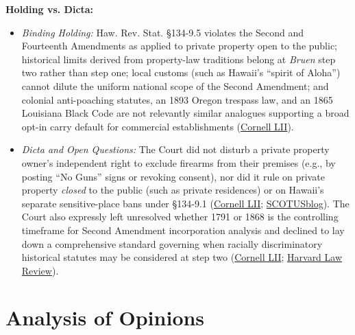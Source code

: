 \documentclass[12pt]{article}
\begin{document}
\textbf{Holding vs. Dicta:}
\begin{itemize}
\item \textit{Binding Holding:} Haw. Rev. Stat. \S{}134-9.5 violates the Second and Fourteenth Amendments as applied to private property open to the public; historical limits derived from property-law traditions belong at \textit{Bruen} step two rather than step one; local customs (such as Hawaii's ``spirit of Aloha'') cannot dilute the uniform national scope of the Second Amendment; and colonial anti-poaching statutes, an 1893 Oregon trespass law, and an 1865 Louisiana Black Code are not relevantly similar analogues supporting a broad opt-in carry default for commercial establishments (\href{https://www.law.cornell.edu/supremecourt/text/24-1046}{Cornell LII}).
\item \textit{Dicta and Open Questions:} The Court did not disturb a private property owner's independent right to exclude firearms from their premises (e.g., by posting ``No Guns'' signs or revoking consent), nor did it rule on private property \textit{closed} to the public (such as private residences) or on Hawaii's separate sensitive-place bans under \S{}134-9.1 (\href{https://www.law.cornell.edu/supremecourt/text/24-1046}{Cornell LII}; \href{https://www.scotusblog.com/2026/06/supreme-court-strikes-hawaii-gun-restriction/}{SCOTUSblog}). The Court also expressly left unresolved whether 1791 or 1868 is the controlling timeframe for Second Amendment incorporation analysis and declined to lay down a comprehensive standard governing when racially discriminatory historical statutes may be considered at step two (\href{https://www.law.cornell.edu/supremecourt/text/24-1046}{Cornell LII}; \href{https://harvardlawreview.org/print/vol-140/wolford-v-lopez/}{Harvard Law Review}).
\end{itemize}

\section{Analysis of Opinions}
\end{document}
